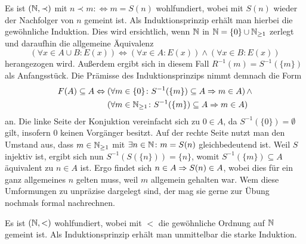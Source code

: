 Es ist $(\mathbb N,\prec)$ mit $n\prec m :\Leftrightarrow m=S(n)$ wohlfundiert,
wobei mit $S(n)$ wieder der Nachfolger von $n$ gemeint ist.
Als Induktionsprinzip erhält man hierbei die gewöhnliche Induktion.
Dies wird ersichtlich, wenn $\mathbb N$ in $\mathbb N=\{0\}\cup\mathbb N_{\ge 1}$ zerlegt
und daraufhin die allgemeine Äquivalenz
\[(\forall x\in A\cup B\colon E(x)) \Leftrightarrow
(\forall x\in A\colon E(x))\land (\forall x\in B\colon E(x))\]
herangezogen wird. Außerdem ergibt sich in diesem Fall
$R^{-1}(m) = S^{-1}(\{m\})$ als Anfangsstück. Die Prämisse des
Induktionsprinzips nimmt demnach die Form
\begin{align*}
F(A)\subseteq A \Leftrightarrow\; &(\forall m\in\{0\}\colon S^{-1}(\{m\})\subseteq A\Rightarrow m\in A)\,{\land}\\
&(\forall m\in\mathbb N_{\ge 1}\colon S^{-1}(\{m\})\subseteq A\Rightarrow m\in A)
\end{align*}
an. Die linke Seite der Konjuktion vereinfacht sich zu $0\in A$,
da $S^{-1}(\{0\})=\emptyset$ gilt, insofern $0$ keinen Vorgänger besitzt.
Auf der rechte Seite nutzt man
den Umstand aus, dass $m\in\mathbb N_{\ge 1}$ mit $\exists n\in\mathbb N\colon m=S(n)$
gleichbedeutend ist. Weil $S$ injektiv ist, ergibt sich nun
$S^{-1}(S(\{n\})) = \{n\}$, womit $S^{-1}(\{m\})\subseteq A$
äquivalent zu $n\in A$ ist. Ergo findet sich $n\in A\Rightarrow S(n)\in A$,
wobei dies für ein ganz allgemeines $n$ gelten muss, weil $m$ allgemein
gehalten war. Wem diese Umformungen zu unpräzise dargelegt sind, der mag
sie gerne zur Übung nochmals formal nachrechnen.

Es ist $(\mathbb N,<)$ wohlfundiert, wobei mit $<$ die gewöhnliche Ordnung
auf $\mathbb N$ gemeint ist. Als Induktionsprinzip erhält man unmittelbar die starke
Induktion.


